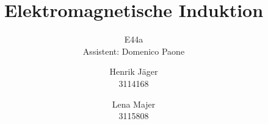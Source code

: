 \documentclass[12pt,a4paper,]{scrreprt}
\begin{document}
\title{Elektromagnetische Induktion}
\author{Henrik Jäger \\ 3114168 \and Lena Majer \\ 3115808}
\subtitle{E44a \\  Assistent: Domenico Paone}
\subject{Physikalisches Praktikum I}
\publishers{Universität Stuttgart}

\maketitle%

\tableofcontents   %
\pagebreak

	
	
	
	
	
	
	
	


	

	

	
	
\end{document}
